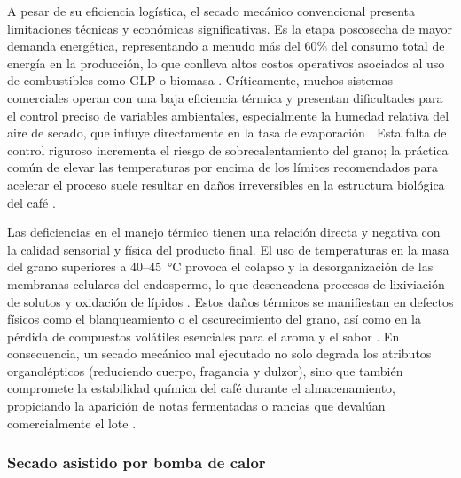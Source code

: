 A pesar de su eficiencia logística, el secado mecánico convencional presenta limitaciones técnicas y económicas significativas. Es la etapa poscosecha de mayor demanda energética, representando a menudo más del 60\% del consumo total de energía en la producción, lo que conlleva altos costos operativos asociados al uso de combustibles como GLP o biomasa \parencite{coradi_development_2021}. Críticamente, muchos sistemas comerciales operan con una baja eficiencia térmica y presentan dificultades para el control preciso de variables ambientales, especialmente la humedad relativa del aire de secado, que influye directamente en la tasa de evaporación \parencite{coradi_development_2021, andrade_mathematical_2019, fernando_effect_2025}. Esta falta de control riguroso incrementa el riesgo de sobrecalentamiento del grano; la práctica común de elevar las temperaturas por encima de los límites recomendados para acelerar el proceso suele resultar en daños irreversibles en la estructura biológica del café \parencite{alves_physiological_2017, borem_quality_2018, coradi_development_2021}.

Las deficiencias en el manejo térmico tienen una relación directa y negativa con la calidad sensorial y física del producto final. El uso de temperaturas en la masa del grano superiores a 40--45~°C provoca el colapso y la desorganización de las membranas celulares del endospermo, lo que desencadena procesos de lixiviación de solutos y oxidación de lípidos \parencite{borem_quality_2018, coradi_development_2021, oliveira_quality_2018, penuela_martinez_influence_2023, sandeep_effect_2021}. Estos daños térmicos se manifiestan en defectos físicos como el blanqueamiento o el oscurecimiento del grano, así como en la pérdida de compuestos volátiles esenciales para el aroma y el sabor \parencite{abreu_influence_2025, coradi_development_2021, parra-coronado_preliminary_2020, penuela_martinez_influence_2023}. En consecuencia, un secado mecánico mal ejecutado no solo degrada los atributos organolépticos (reduciendo cuerpo, fragancia y dulzor), sino que también compromete la estabilidad química del café durante el almacenamiento, propiciando la aparición de notas fermentadas o rancias que devalúan comercialmente el lote \parencite{borem_quality_2018, sandeep_effect_2021, alves_physiological_2017, coradi_development_2021, oliveira_quality_2018, parra-coronado_preliminary_2020}.

\subsubsection{Secado asistido por bomba de calor}

